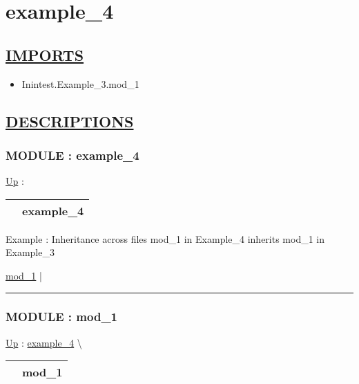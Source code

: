 \chapter*{example\_4}
\hypertarget{ecldoc:toc:example_4}{}

\section*{\underline{IMPORTS}}
\begin{itemize}
\item Inintest.Example\_3.mod\_1
\end{itemize}

\section*{\underline{DESCRIPTIONS}}
\subsection*{MODULE : example\_4}
\hypertarget{ecldoc:example_4}{}
\hyperlink{ecldoc:toc:root}{Up} :

{\renewcommand{\arraystretch}{1.5}
\begin{tabularx}{\textwidth}{|>{\raggedright\arraybackslash}l|X|}
\hline
\hspace{0pt} & example\_4 \\
\hline
\end{tabularx}
}

\par
Example : Inheritance across files mod\_1 in Example\_4 inherits mod\_1 in Example\_3


\hyperlink{ecldoc:example_4.mod_1}{mod\_1}  |

\rule{\linewidth}{0.5pt}

\subsection*{MODULE : mod\_1}
\hypertarget{ecldoc:example_4.mod_1}{}
\hyperlink{ecldoc:example_4}{Up} :
\hspace{0pt} \hyperlink{ecldoc:example_4}{example_4} \textbackslash 

{\renewcommand{\arraystretch}{1.5}
\begin{tabularx}{\textwidth}{|>{\raggedright\arraybackslash}l|X|}
\hline
\hspace{0pt} & mod\_1 \\
\hline
\end{tabularx}
}

